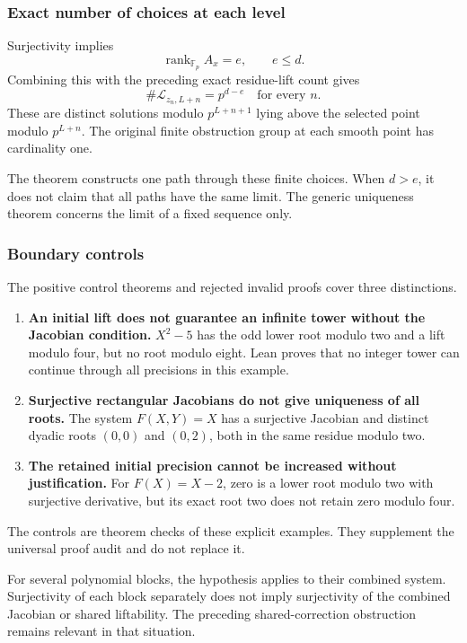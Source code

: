 \hypertarget{cont3:exact-number-of-choices-at-each-level}{%
\subsubsection{Exact number of choices at each
level}\label{cont3:exact-number-of-choices-at-each-level}}

Surjectivity implies \[
\operatorname{rank}_{\mathbb F_p}A_x=e,\qquad e\le d.
\] Combining this with the preceding exact residue-lift count gives \[
\boxed{\#\mathcal L_{z_n,L+n}=p^{d-e}\quad\text{for every }n.}
\] These are distinct solutions modulo \(p^{L+n+1}\) lying above the
selected point modulo \(p^{L+n}\). The original finite obstruction group
at each smooth point has cardinality one.

The theorem constructs one path through these finite choices. When
\(d>e\), it does not claim that all paths have the same limit. The
generic uniqueness theorem concerns the limit of a fixed sequence only.

\hypertarget{cont3:boundary-controls}{%
\subsubsection{Boundary controls}\label{cont3:boundary-controls}}

The positive control theorems and rejected invalid proofs cover three
distinctions.

\begin{enumerate}
\def\labelenumi{\arabic{enumi}.}
\tightlist
\item
  \textbf{An initial lift does not guarantee an infinite tower without
  the Jacobian condition.} \(X^2-5\) has the odd lower root modulo two
  and a lift modulo four, but no root modulo eight. Lean proves that no
  integer tower can continue through all precisions in this example.
\item
  \textbf{Surjective rectangular Jacobians do not give uniqueness of all
  roots.} The system \(F(X,Y)=X\) has a surjective Jacobian and distinct
  dyadic roots \((0,0)\) and \((0,2)\), both in the same residue modulo
  two.
\item
  \textbf{The retained initial precision cannot be increased without
  justification.} For \(F(X)=X-2\), zero is a lower root modulo two with
  surjective derivative, but its exact root two does not retain zero
  modulo four.
\end{enumerate}

The controls are theorem checks of these explicit examples. They
supplement the universal proof audit and do not replace it.

For several polynomial blocks, the hypothesis applies to their combined
system. Surjectivity of each block separately does not imply
surjectivity of the combined Jacobian or shared liftability. The
preceding shared-correction obstruction remains relevant in that
situation.
